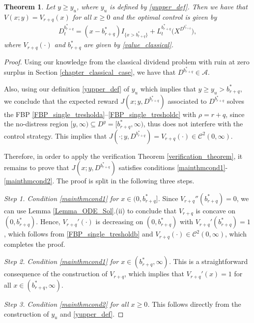 \documentclass[11pt]{article} %
\newtheorem{theorem}{Theorem}
\numberwithin{komcounter}{section}
\numberwithin{equation}{section}
\numberwithin{theorem}{section}
\begin{document}
\begin{theorem}\label{theorem_optimal_yupper}
Let $y\geq y_u$, where $y_u$ is defined by \eqref{yupper_def}. 
Then we have that $V(x;y) = V_{r+q}(x)$  for all $x \geq 0$ and the optimal control is given by 
\begin{align*}
D^{b^*_{r+q}}_t=(x-b^*_{r+q})I_{\{x>b^*_{r+q}\}}+ L^{b^*_{r+q}}_t \big( X^{D^{b^*_{r+q}}} \big),
\end{align*}
where $V_{r+q}(\cdot)$ and $b_{r+q}^*$ are given by \eqref{value_classical}. 
\end{theorem}
\begin{proof}
Using our knowledge from the classical dividend problem with ruin at zero surplus in Section \ref{chapter_classical_case}, we have that $D^{b^*_{r+q}}\in \mathcal{A}$. 

Also, using our definition \eqref{yupper_def} of $y_u$ which implies that $y \geq y_u > b^*_{r+q}$, we conclude that the expected reward $J(x;y,D^{b^*_{r+q}})$ associated to $D^{b^*_{r+q}}$ solves the FBP \eqref{FBP_single_tresholda}--\eqref{FBP_single_tresholdc} with $\rho=r+q$, since the no-distress region $[y,\infty) \subseteq {D}^y = [b_{r+q}^*, \infty)$, thus does not interfere with the control strategy. 
This implies that $J(\cdot;y,D^{b^*_{r+q}}) = V_{r+q}(\cdot) \in \mathcal{C}^2(0,\infty)$.

Therefore, in order to apply the verification Theorem \ref{verification_theorem}, it remains to prove that $J(x;y,D^{b^*_{r+q}})$ satisfies conditions \eqref{mainthmcond1}-\eqref{mainthmcond2}.
The proof is split in the following three steps.

\vspace{1mm}
{\it Step 1. Condition \eqref{mainthmcond1} for $x\in (0,b_{r+q}^*]$.} 
Since $V_{r+q}''(b^*_{r+q})=0$, we can use Lemma \ref{Lemma_ODE_Sol}.(ii) to conclude that $V_{r+q}$ is concave on $(0,b^*_{r+q})$.
Hence, $V_{r+q}'(\cdot)$ is decreasing on $(0,b^*_{r+q})$ with $V_{r+q}'(b^*_{r+q})=1$, which follows from \eqref{FBP_single_tresholdb} and $V_{r+q}(\cdot) \in \mathcal{C}^2(0,\infty)$, which completes the proof.

\vspace{1mm}
{\it Step 2. Condition \eqref{mainthmcond1} for $x\in (b_{r+q}^*,\infty)$.} 
This is a straightforward consequence of the construction of $V_{r+q}$, which implies that $V_{r+q}'(x)=1$ for all $x\in (b_{r+q}^*,\infty)$.

\vspace{1mm}
{\it Step 3. Condition \eqref{mainthmcond2} for all $x \geq 0$.} 
This follows directly from the construction of $y_u$ and \eqref{yupper_def}. 
\end{proof}
\end{document}
